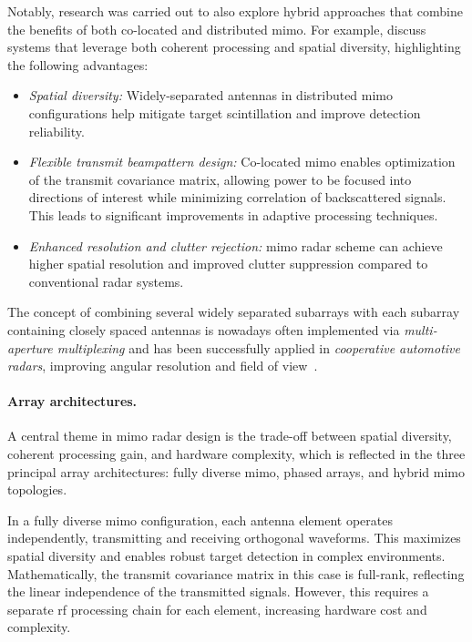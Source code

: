 Notably, research was carried out to also explore hybrid approaches that combine the benefits of both co-located and distributed \gls{mimo}.
For example, \textcite{xuIterativeGeneralizedLikelihoodRatio2007} discuss systems that leverage both coherent processing and spatial diversity, highlighting the following advantages:
\begin{itemize}
    \item \textit{Spatial diversity:} Widely-separated antennas in distributed \gls{mimo} configurations help mitigate target scintillation and improve detection reliability.
    \item \textit{Flexible transmit beampattern design:} Co-located \gls{mimo} enables optimization of the transmit covariance matrix, allowing power to be focused into directions of interest while minimizing correlation of backscattered signals.
    This leads to significant improvements in adaptive processing techniques.
    \item \textit{Enhanced resolution and clutter rejection:} \gls{mimo} radar scheme can achieve higher spatial resolution and improved clutter suppression compared to conventional radar systems.
\end{itemize}

The concept of combining several widely separated subarrays with each subarray containing closely spaced antennas is nowadays often implemented via \emph{multi-aperture multiplexing} and has been successfully applied in \emph{cooperative automotive radars}, improving angular resolution and field of view~\parencite{liangCooperativeAutomotiveRadars2022}.

\paragraph{Array architectures.}
A central theme in \gls{mimo} radar design is the trade-off between spatial diversity, coherent processing gain, and hardware complexity, which is reflected in the three principal array architectures: fully diverse \gls{mimo}, phased arrays, and hybrid \gls{mimo} topologies.

In a fully diverse \gls{mimo} configuration, each antenna element operates independently, transmitting and receiving orthogonal waveforms.
This maximizes spatial diversity and enables robust target detection in complex environments.
Mathematically, the transmit covariance matrix in this case is full-rank, reflecting the linear independence of the transmitted signals.
However, this requires a separate \gls{rf} processing chain for each element, increasing hardware cost and complexity.


